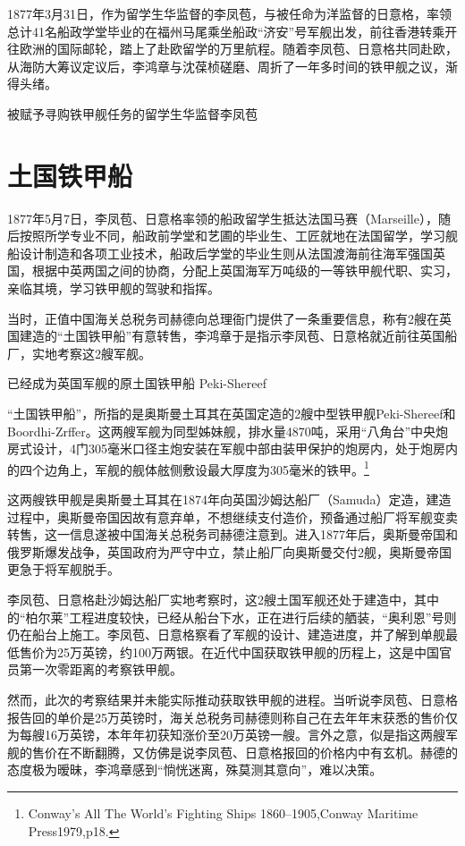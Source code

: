 \documentclass[12pt,UTF8]{ctexbook}
\begin{document}
1877年3月31日，作为留学生华监督的李凤苞，与被任命为洋监督的日意格，率领总计41名船政学堂毕业的在福州马尾乘坐船政“济安”号军舰出发，前往香港转乘开往欧洲的国际邮轮，踏上了赴欧留学的万里航程。随着李凤苞、日意格共同赴欧，从海防大筹议定议后，李鸿章与沈葆桢磋磨、周折了一年多时间的铁甲舰之议，渐得头绪。

被赋予寻购铁甲舰任务的留学生华监督李凤苞

\section{土国铁甲船}

1877年5月7日，李凤苞、日意格率领的船政留学生抵达法国马赛（Marseille），随后按照所学专业不同，船政前学堂和艺圃的毕业生、工匠就地在法国留学，学习舰船设计制造和各项工业技术，船政后学堂的毕业生则从法国渡海前往海军强国英国，根据中英两国之间的协商，分配上英国海军万吨级的一等铁甲舰代职、实习，亲临其境，学习铁甲舰的驾驶和指挥。

当时，正值中国海关总税务司赫德向总理衙门提供了一条重要信息，称有2艘在英国建造的“土国铁甲船”有意转售，李鸿章于是指示李凤苞、日意格就近前往英国船厂，实地考察这2艘军舰。

已经成为英国军舰的原土国铁甲船 Peki-Shereef

“土国铁甲船”，所指的是奥斯曼土耳其在英国定造的2艘中型铁甲舰Peki-Shereef和 Boordhi-Zrffer。这两艘军舰为同型姊妹舰，排水量4870吨，采用“八角台”中央炮房式设计，4门305毫米口径主炮安装在军舰中部由装甲保护的炮房内，处于炮房内的四个边角上，军舰的舰体舷侧敷设最大厚度为305毫米的铁甲。\footnote{Conway's All The World's Fighting Ships 1860--1905,Conway Maritime Press1979,p18.}

这两艘铁甲舰是奥斯曼土耳其在1874年向英国沙姆达船厂（Samuda）定造，建造过程中，奥斯曼帝国因故有意弃单，不想继续支付造价，预备通过船厂将军舰变卖转售，这一信息遂被中国海关总税务司赫德注意到。进入1877年后，奥斯曼帝国和俄罗斯爆发战争，英国政府为严守中立，禁止船厂向奥斯曼交付2舰，奥斯曼帝国更急于将军舰脱手。

李凤苞、日意格赴沙姆达船厂实地考察时，这2艘土国军舰还处于建造中，其中的“柏尔莱”工程进度较快，已经从船台下水，正在进行后续的舾装，“奥利恩”号则仍在船台上施工。李凤苞、日意格察看了军舰的设计、建造进度，并了解到单舰最低售价为25万英镑，约100万两银。在近代中国获取铁甲舰的历程上，这是中国官员第一次零距离的考察铁甲舰。

然而，此次的考察结果并未能实际推动获取铁甲舰的进程。当听说李凤苞、日意格报告回的单价是25万英镑时，海关总税务司赫德则称自己在去年年末获悉的售价仅为每艘16万英镑，本年年初获知涨价至20万英镑一艘。言外之意，似是指这两艘军舰的售价在不断翻腾，又仿佛是说李凤苞、日意格报回的价格内中有玄机。赫德的态度极为暧昧，李鸿章感到“惝恍迷离，殊莫测其意向”，难以决策。
\end{document}
